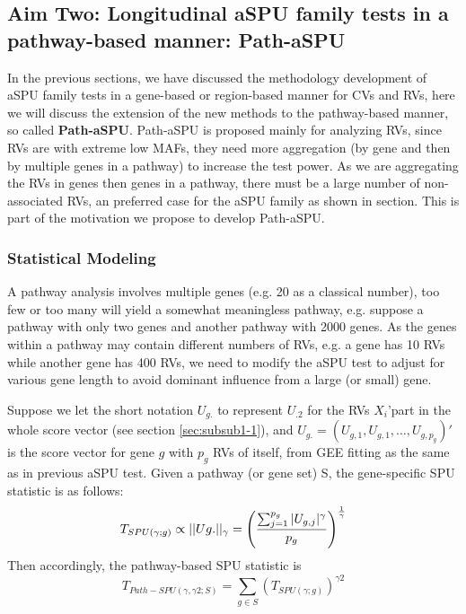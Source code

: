 \documentclass[12pt]{article}
\begin{document}
\subsection{Aim Two: Longitudinal aSPU family tests in a pathway-based manner: Path-aSPU}
\label{sec:aim2}
In the previous sections, we have discussed the methodology development of aSPU family tests in a gene-based or region-based manner for CVs and RVs, here we will discuss the extension of the new methods to the pathway-based manner, so called \textbf{Path-aSPU}. Path-aSPU is proposed mainly for analyzing RVs, since RVs are with extreme low MAFs, they need more aggregation (by gene and then by multiple genes in a pathway) to increase the test power. As we are aggregating the RVs in genes then genes in a pathway, there must be a large number of non-associated RVs, an preferred case for the aSPU family as shown in section. This is part of the motivation we propose to develop Path-aSPU. 
\subsubsection{Statistical Modeling}\label{sec:aim2-1}
A pathway analysis involves multiple genes (e.g. 20 as a classical number), too few or too many will yield a somewhat meaningless pathway, e.g. suppose a pathway with only two genes and another pathway with 2000 genes. As the genes within a pathway may contain different numbers of RVs, e.g. a gene has 10 RVs while another gene has 400 RVs, we need to modify the aSPU test to adjust for various gene length to avoid dominant influence from a large (or small) gene.

Suppose we let the short notation $U_{g.}$ to represent $U_{.2}$ for the RVs $X_i$'part in the whole score vector (see section \ref{sec:subsub1-1}), and $U_{g.} = (U_{g,1},U_{g,1},\ldots, U_{g,p_g})'$ is the score vector for gene $g$ with $p_g$ RVs of itself, from GEE fitting as the same as in previous aSPU test. Given a pathway (or gene set) S, the gene-specific SPU statistic is as follows:
\begin{equation}
T_ { SPU(\gamma ; g) } \propto || Ug.||_{\gamma} =  \left( \frac{  \sum_{j=1} ^ {p_g} |U_{g, j}| ^ { \gamma }  }{p_g} \right) ^ { 1 \over \gamma }
\end{equation}  
Then accordingly, the pathway-based SPU statistic is
\begin{equation}
T _ { Path-SPU(\gamma, \gamma2 ; S) } = \sum_{g \in S} ( T_ { SPU(\gamma ; g) } ) ^ {\gamma2}
\end{equation}  
\end{document}
